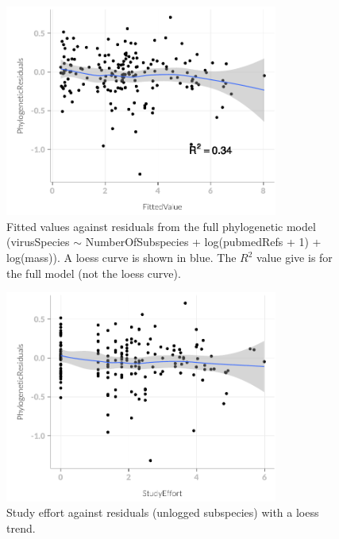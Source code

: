 \begin{knitrout}
\begin{figure}[t]

{\centering \includegraphics[width=0.8\textwidth]{figure/subsAnalysis-5} 

}

\caption[Fitted values against residuals from the full phylogenetic model (virusSpecies ]{Fitted values against residuals from the full phylogenetic model (virusSpecies $\sim$ NumberOfSubspecies + log(pubmedRefs + 1) +   log(mass)). A loess curve is shown in blue.
The $R^2$ value give is for the full model (not the loess curve).}\label{fig:subsAnalysis}
\end{figure}

\begin{figure}[t]

{\centering \includegraphics[width=0.8\textwidth]{figure/subsAnalysis-6} 

}

\caption[Study effort against residuals (unlogged subspecies) with a loess trend]{Study effort against residuals (unlogged subspecies) with a loess trend.}\label{fig:subsAnalysis}
\end{figure}


\end{knitrout}
